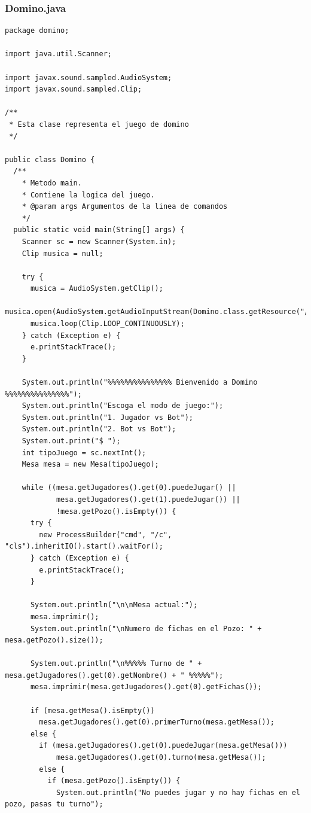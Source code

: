 \documentclass[12pt]{article}
\begin{document}
  \subsubsection{Domino.java}
  \begin{lstlisting}
package domino;

import java.util.Scanner;

import javax.sound.sampled.AudioSystem;
import javax.sound.sampled.Clip;

/**
 * Esta clase representa el juego de domino
 */

public class Domino {
  /**
    * Metodo main.
    * Contiene la logica del juego.
    * @param args Argumentos de la linea de comandos
    */
  public static void main(String[] args) {
    Scanner sc = new Scanner(System.in);
    Clip musica = null;

    try {
      musica = AudioSystem.getClip();
      musica.open(AudioSystem.getAudioInputStream(Domino.class.getResource("/recursos/MoonlightSonata.wav")));
      musica.loop(Clip.LOOP_CONTINUOUSLY); 
    } catch (Exception e) {
      e.printStackTrace();
    }

    System.out.println("%%%%%%%%%%%%%%% Bienvenido a Domino %%%%%%%%%%%%%%%");
    System.out.println("Escoga el modo de juego:");
    System.out.println("1. Jugador vs Bot");
    System.out.println("2. Bot vs Bot");
    System.out.print("$ ");
    int tipoJuego = sc.nextInt();
    Mesa mesa = new Mesa(tipoJuego);

    while ((mesa.getJugadores().get(0).puedeJugar() || 
            mesa.getJugadores().get(1).puedeJugar()) || 
            !mesa.getPozo().isEmpty()) {
      try {
        new ProcessBuilder("cmd", "/c", "cls").inheritIO().start().waitFor();
      } catch (Exception e) {
        e.printStackTrace();
      }

      System.out.println("\n\nMesa actual:");
      mesa.imprimir();
      System.out.println("\nNumero de fichas en el Pozo: " + mesa.getPozo().size());
      
      System.out.println("\n%%%%% Turno de " + mesa.getJugadores().get(0).getNombre() + " %%%%%");
      mesa.imprimir(mesa.getJugadores().get(0).getFichas());

      if (mesa.getMesa().isEmpty())
        mesa.getJugadores().get(0).primerTurno(mesa.getMesa());
      else {
        if (mesa.getJugadores().get(0).puedeJugar(mesa.getMesa())) 
            mesa.getJugadores().get(0).turno(mesa.getMesa());
        else { 
          if (mesa.getPozo().isEmpty()) { 
            System.out.println("No puedes jugar y no hay fichas en el pozo, pasas tu turno");


\end{lstlisting}
\end{document}
